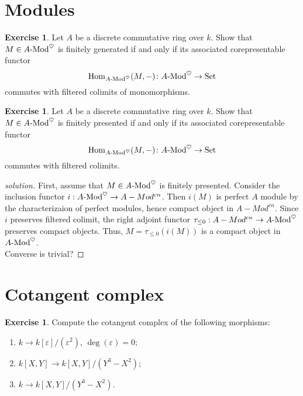 \documentclass[10pt,a4paper,reqno,oneside]{book} %
\theoremstyle{plain}
\theoremstyle{definition}
\newtheorem{exercise}[thm]{Exercise}
\theoremstyle{remark}
\numberwithin{equation}{section}
\begin{document}
\section{Modules}

\begin{exercise}
	Let $A$ be a discrete commutative ring over $k$.
	Show that $M \in A\textrm{-}\mathrm{Mod}^\heartsuit$ is finitely generated if and only if its associated corepresentable functor
	\[ \operatorname{Hom}_{A\textrm{-}\mathrm{Mod}^\heartsuit}(M,-) \colon A \textrm{-}\mathrm{Mod}^\heartsuit \to \mathrm{Set} \]
	commutes with filtered colimits of monomorphisms.
\end{exercise}

\begin{exercise}
	Let $A$ be a discrete commutative ring over $k$.
	Show that $M \in A \textrm{-}\mathrm{Mod}^\heartsuit$ is finitely presented if and only if its associated corepresentable functor
	\[ \operatorname{Hom}_{A\textrm{-}\mathrm{Mod}^\heartsuit}(M,-) \colon A \textrm{-}\mathrm{Mod}^\heartsuit \to \mathrm{Set} \]
	commutes with filtered colimits.
\end{exercise}

\ifpersonal
\begin{proof}[solution] 
First, assume that $M \in A \textrm{-}\mathrm{Mod}^\heartsuit$ is finitely presented. Consider the inclusion functor $i:A\textrm{-}\mathrm{Mod}^\heartsuit \to A-Mod^{cn}$. Then $i(M)$ is perfect $A$ module by the characterizaion of perfect modules, hence compact object in $A-Mod^{cn}$. Since $i$ preserves filtered colimit, the right adjoint functor $\tau_{\leq0}:A-Mod^{cn} \to A\textrm{-}\mathrm{Mod}^\heartsuit$ preserves compact objects. Thus, $M=\tau_{\leq0}(i(M))$ is a compact object in $A\textrm{-}\mathrm{Mod}^\heartsuit$.\\
Converse is trivial?
\end{proof}
\fi

\section{Cotangent complex}

\begin{exercise}
\label{ex:cotangent_comp}
	Compute the cotangent complex of the following morphisms:
	\begin{enumerate}
		\item $k \to k[\varepsilon] / (\varepsilon^2)$, $\deg(\varepsilon) = 0$;
		\item $k[X,Y] \to k[X,Y] / (Y^3 - X^2)$;
		\item $k \to k[X,Y] / (Y^3 - X^2)$.
	\end{enumerate}
\end{exercise}
\end{document}
